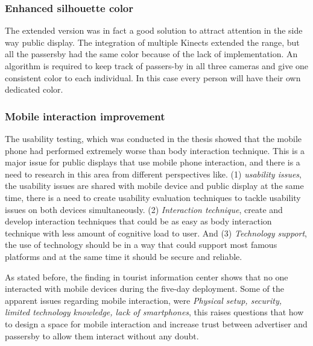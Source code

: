 \subsubsection{Enhanced silhouette color}
The extended version was in fact a good solution to attract attention in the side way public display. The integration of multiple Kinects extended the range, but all the passersby had the same color because of the lack of implementation. An algorithm is required to keep track of passers-by in all three cameras and give one consistent color to each individual. In this case every person will have their own dedicated color.

\subsubsection{Mobile interaction improvement}
The usability testing, which was conducted in the thesis showed that the mobile phone had performed extremely worse than body interaction technique. This is a major issue for public displays that use mobile phone interaction, and there is a need to research in this area from different perspectives like. (1) \emph{usability issues}, the usability issues are shared with mobile device and public display at the same time, there is a need to create usability evaluation techniques to tackle usability issues on both devices simultaneously. (2) \emph{Interaction technique}, create and develop interaction techniques that could be as easy as body interaction technique with less amount of cognitive load to user. And (3) \emph{Technology support}, the use of technology should be in a way that could support most famous platforms and at the same time it should be secure and reliable. 

As stated before, the finding in tourist information center shows that no one interacted with mobile devices during the five-day deployment. Some of the apparent issues regarding mobile interaction, were \emph{Physical setup, security, limited technology knowledge, lack of smartphones}, this raises questions that how to design a space for mobile interaction and increase trust between advertiser and passersby to allow them interact without any doubt. 





